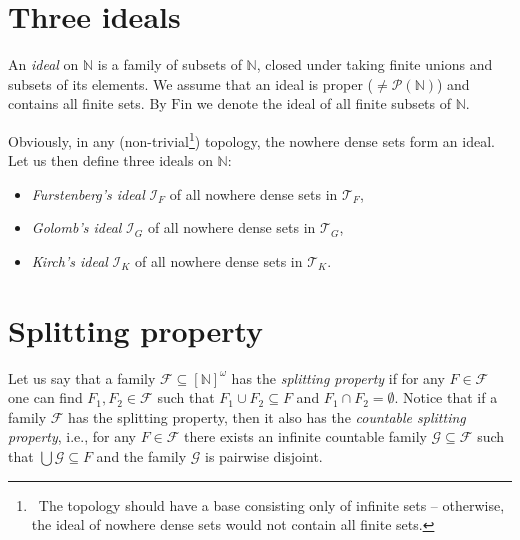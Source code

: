 \documentclass{amsart}
\theoremstyle{definition}
\newcommand{\N}{{\mathbb N}}
\newcommand{\Fin}{\textrm{Fin}}
\newcommand{\I}{\mathcal I}
\newcommand{\T}{\mathcal{T}}
\newcommand{\InfSubs}{[\N]^{\omega}}
\begin{document}
\section*{Three ideals}

An \emph{ideal} on $\N$ is a family of subsets of $\N$, closed under taking finite unions and subsets of its elements. We assume that an ideal is proper ($\neq \mathcal{P}(\N)$) and contains all finite sets. By $\Fin$ we denote the ideal of all finite subsets of $\N$.

Obviously, in any (non-trivial\footnote{\ The topology should have a base consisting only of 
infinite sets -- otherwise, the ideal of nowhere dense sets would not contain all finite sets.}) topology, the nowhere dense sets form an ideal. Let us then define three ideals on $\N$:
\begin{itemize}
\item \emph{Furstenberg's ideal} $\I_F$ of all nowhere dense sets in $\T_F$,
\item \emph{Golomb's ideal} $\I_G$ of all nowhere dense sets in $\T_G$,
\item \emph{Kirch's ideal} $\I_K$ of all nowhere dense sets in $\T_K$.
\end{itemize}


\section*{Splitting property}

Let us say that a family $\mathcal{F} \subseteq \InfSubs$ has the \emph{splitting property} if for any $F \in \mathcal{F}$ one can find $F_1, F_2 \in \mathcal{F}$ such that $F_1 \cup F_2 \subseteq F$ and $F_1 \cap F_2 = \emptyset$. Notice that if a family $\mathcal{F}$ has the splitting property, then it also has the \emph{countable splitting property}, i.e., for any $F \in \mathcal{F}$ there exists an infinite countable family $\mathcal{G} \subseteq \mathcal{F}$ such that $\bigcup{\mathcal{G}} \subseteq F$ and the family $\mathcal{G}$ is pairwise disjoint.
\end{document}
